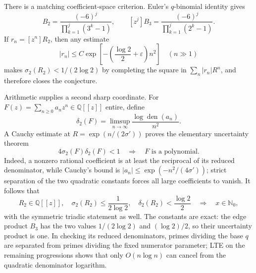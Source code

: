 \documentclass[11pt,oneside]{article}
\theoremstyle{definition}
\theoremstyle{remark}
\newcommand{\Nzero}{\mathbb N_0}
\newcommand{\Q}{\mathbb Q}
\newcommand{\den}{\operatorname{den}}
\begin{document}
There is a matching coefficient-space criterion.  Euler's $q$-binomial identity gives
\begin{equation}
 [z^j]B_2=\frac{(-6)^j}{\prod_{k=1}^j(3^k-1)},\qquad
 [z^j]B_3=\frac{(-6)^j}{\prod_{k=1}^j(2^k-1)}.
 \label{crit:eq-edge-coefficients}
\end{equation}
If $r_n=[z^n]R_2$, then any estimate
\begin{equation}
 |r_n|\le C\exp\!\left[-\left(\frac{\log2}{2}+\varepsilon\right)n^2\right]
 \quad(n\gg1)
 \label{crit:eq-edge-gaussian-certificate}
\end{equation}
makes $\sigma_2(R_2)<1/(2\log2)$ by completing the square in
$\sum_n|r_n|R^n$, and therefore closes the conjecture.

Arithmetic supplies a second sharp coordinate.  For
$F(z)=\sum_{n\ge0}a_nz^n\in\Q[[z]]$ entire, define
\begin{equation}
 \delta_2(F)=\limsup_{n\to\infty}\frac{\log\den(a_n)}{n^2}.
 \label{crit:eq-coefficient-denominator-type}
\end{equation}
A Cauchy estimate at $R=\exp(n/(2\sigma'))$ proves the elementary uncertainty theorem
\begin{equation}
 \boxed{4\sigma_2(F)\delta_2(F)<1\quad\Longrightarrow\quad F\text{ is a polynomial}.}
 \label{crit:eq-coefficient-uncertainty}
\end{equation}
Indeed, a nonzero rational coefficient is at least the reciprocal of its reduced
denominator, while Cauchy's bound is
$|a_n|\le\exp(-n^2/(4\sigma'))$; strict separation of the two quadratic constants forces all
large coefficients to vanish.  It follows that
\begin{equation}
 R_2\in\Q[[z]],\quad
 \sigma_2(R_2)\le\frac1{2\log2},\quad
 \delta_2(R_2)<\frac{\log2}{2}
 \quad\Longrightarrow\quad x\in\Nzero,
 \label{crit:eq-critical-arithmetic-closure}
\end{equation}
with the symmetric triadic statement as well.  The constants are exact: the edge product
$B_3$ has the two values $1/(2\log2)$ and $(\log2)/2$, so their uncertainty product is one.
In checking its reduced denominators, primes dividing the base $q$ are separated from primes
dividing the fixed numerator parameter; LTE on the remaining progressions shows that only
$O(n\log n)$ can cancel from the quadratic denominator logarithm.
\end{document}
